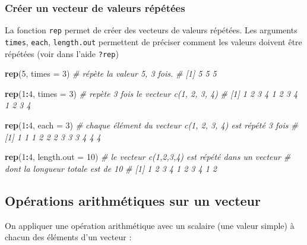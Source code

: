 \documentclass[
]{book}
\newenvironment{Shaded}{\begin{snugshade}}{\end{snugshade}}
\newcommand{\AttributeTok}[1]{\textcolor[rgb]{0.13,0.29,0.53}{#1}}
\newcommand{\CommentTok}[1]{\textcolor[rgb]{0.56,0.35,0.01}{\textit{#1}}}
\newcommand{\DecValTok}[1]{\textcolor[rgb]{0.00,0.00,0.81}{#1}}
\newcommand{\FunctionTok}[1]{\textcolor[rgb]{0.13,0.29,0.53}{\textbf{#1}}}
\newcommand{\NormalTok}[1]{#1}
\newcommand{\SpecialCharTok}[1]{\textcolor[rgb]{0.81,0.36,0.00}{\textbf{#1}}}
\begin{document}
\subsubsection{Créer un vecteur de valeurs répétées}\label{cruxe9er-un-vecteur-de-valeurs-ruxe9puxe9tuxe9es}

La fonction \texttt{rep} permet de créer des vecteurs de valeurs répétées.
Les arguments \texttt{times}, \texttt{each}, \texttt{length.out} permettent de préciser comment les valeurs doivent être répétées (voir dans l'aide \texttt{?rep})

\begin{Shaded}
\begin{Highlighting}[]
\FunctionTok{rep}\NormalTok{(}\DecValTok{5}\NormalTok{, }\AttributeTok{times =} \DecValTok{3}\NormalTok{) }\CommentTok{\# répète la valeur 5, 3 fois.}
\CommentTok{\# [1] 5 5 5}

\FunctionTok{rep}\NormalTok{(}\DecValTok{1}\SpecialCharTok{:}\DecValTok{4}\NormalTok{, }\AttributeTok{times =} \DecValTok{3}\NormalTok{) }\CommentTok{\# repète 3 fois le vecteur c(1, 2, 3, 4)}
\CommentTok{\# [1] 1 2 3 4 1 2 3 4 1 2 3 4}

\FunctionTok{rep}\NormalTok{(}\DecValTok{1}\SpecialCharTok{:}\DecValTok{4}\NormalTok{, }\AttributeTok{each =} \DecValTok{3}\NormalTok{) }\CommentTok{\# chaque élément du vecteur c(1, 2, 3, 4) est répété 3 fois}
\CommentTok{\# [1] 1 1 1 2 2 2 3 3 3 4 4 4}

\FunctionTok{rep}\NormalTok{(}\DecValTok{1}\SpecialCharTok{:}\DecValTok{4}\NormalTok{, }\AttributeTok{length.out =} \DecValTok{10}\NormalTok{) }\CommentTok{\# le vecteur c(1,2,3,4) est répété dans un vecteur }
\CommentTok{\# dont la longueur totale est de 10}
\CommentTok{\# [1] 1 2 3 4 1 2 3 4 1 2}
\end{Highlighting}
\end{Shaded}

\subsection{Opérations arithmétiques sur un vecteur}\label{opuxe9rations-arithmuxe9tiques-sur-un-vecteur}

On appliquer une opération arithmétique avec un scalaire (une valeur simple) à chacun des éléments d'un vecteur :
\end{document}
